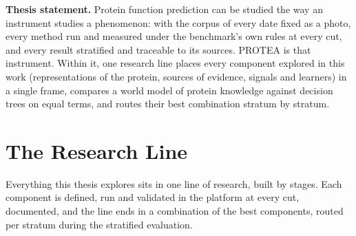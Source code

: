 \textbf{Thesis statement.} Protein function prediction can be studied the way an
instrument studies a phenomenon: with the corpus of every date fixed as a photo, every
method run and measured under the benchmark's own rules at every cut, and every result
stratified and traceable to its sources. PROTEA is that instrument. Within it, one
research line places every component explored in this work (representations of the
protein, sources of evidence, signals and learners) in a single frame, compares a world
model of protein knowledge against decision trees on equal terms, and routes their best
combination stratum by stratum.

\section{The Research Line}
\label{sec:research-line}

Everything this thesis explores sits in one line of research, built by stages. Each
component is defined, run and validated in the platform at every cut, documented, and
the line ends in a combination of the best components, routed per stratum during the
stratified evaluation.

